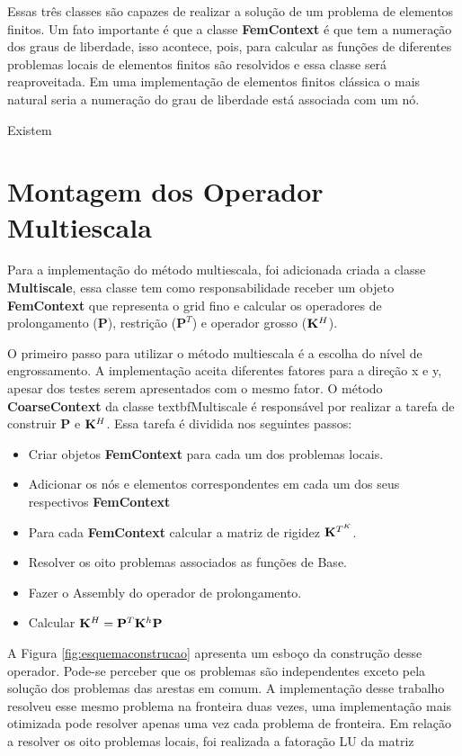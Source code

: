 Essas três classes são capazes de realizar a solução de um problema de elementos finitos. Um fato importante é que a classe \textbf{FemContext} é que tem a numeração dos graus de liberdade, isso acontece, pois, para calcular as funções de diferentes problemas locais de elementos finitos são resolvidos e essa classe será reaproveitada. Em uma implementação de elementos finitos clássica o mais natural seria a numeração do grau de liberdade está associada com um nó.

Existem 

\section{Montagem dos Operador Multiescala}

Para a implementação do método multiescala, foi adicionada criada a classe \textbf{Multiscale}, essa classe tem como responsabilidade receber um objeto \textbf{FemContext} que representa o grid fino e calcular os operadores de prolongamento ($\mathbf{P}$), restrição ($\mathbf{P}^T$) e operador grosso ($\mathbf{K}^H$).


O primeiro passo para utilizar o método multiescala é a escolha do nível de engrossamento. A implementação aceita diferentes fatores para a direção x e y, apesar dos testes serem apresentados com o mesmo fator. O método \textbf{CoarseContext} da classe textbf{Multiscale} é responsável por realizar a tarefa de construir $\mathbf{P}$ e $\mathbf{K}^H$. Essa tarefa é dividida nos seguintes passos: 

\begin{itemize}
    \item Criar objetos \textbf{FemContext} para cada um dos problemas locais.
    \item Adicionar os nós e elementos correspondentes em cada um dos seus respectivos \textbf{FemContext}
    \item Para cada \textbf{FemContext} calcular a matriz de rigidez $\mathbf{K}^{T^K}$.
    \item Resolver os oito problemas associados as funções de Base.
    \item Fazer o Assembly do operador de prolongamento.
    \item Calcular $\mathbf{K}^H = \mathbf{P}^T \mathbf{K}^h \mathbf{P}$
\end{itemize}

A Figura \ref{fig:esquemaconstrucao} apresenta um esboço da construção desse operador. Pode-se perceber que os problemas são independentes exceto pela solução dos problemas das arestas em comum. A implementação desse trabalho resolveu esse mesmo problema na fronteira duas vezes, uma implementação mais otimizada pode resolver apenas uma vez cada problema de fronteira. Em relação a resolver os oito problemas locais, foi realizada a fatoração LU da matriz 

